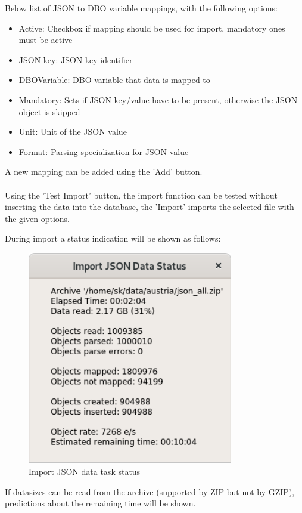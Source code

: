 Below list of JSON to DBO variable mappings, with the following options:

\begin{itemize}  
\item Active: Checkbox if mapping should be used for import, mandatory ones must be active
\item JSON key: JSON key identifier
\item DBOVariable: DBO variable that data is mapped to
\item Mandatory: Sets if JSON key/value have to be present, otherwise the JSON object is skipped
\item Unit: Unit of the JSON value
\item Format: Parsing specialization for JSON value
\end{itemize}

A new mapping can be added using the 'Add' button. \\\\

Using the 'Test Import' button, the import function can be tested without inserting the data into the database, the 'Import' imports the selected file with the given options.

During import a status indication will be shown as follows:

\begin{figure}[H]
  \center
    \includegraphics[width=9cm,frame]{../screenshots/json_import_status.png}
  \caption{Import JSON data task status}
\end{figure}

If datasizes can be read from the archive (supported by ZIP but not by GZIP), predictions about the remaining time will be shown.

